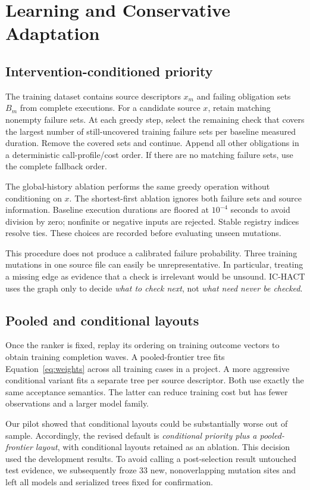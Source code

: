 \documentclass[11pt]{article}
\theoremstyle{definition}\newtheorem{definition}[theorem]{Definition}
\theoremstyle{remark}\newtheorem{remark}[theorem]{Remark}
\begin{document}
\section{Learning and Conservative Adaptation}
\subsection{Intervention-conditioned priority}
The training dataset contains source descriptors $x_m$ and failing obligation sets $B_m$ from complete executions. For a candidate source $x$, retain matching nonempty failure sets. At each greedy step, select the remaining check that covers the largest number of still-uncovered training failure sets per baseline measured duration. Remove the covered sets and continue. Append all other obligations in a deterministic call-profile/cost order. If there are no matching failure sets, use the complete fallback order.

The global-history ablation performs the same greedy operation without conditioning on $x$. The shortest-first ablation ignores both failure sets and source information. Baseline execution durations are floored at $10^{-4}$ seconds to avoid division by zero; nonfinite or negative inputs are rejected. Stable registry indices resolve ties. These choices are recorded before evaluating unseen mutations.

This procedure does not produce a calibrated failure probability. Three training mutations in one source file can easily be unrepresentative. In particular, treating a missing edge as evidence that a check is irrelevant would be unsound. IC-HACT uses the graph only to decide \emph{what to check next}, not \emph{what need never be checked}.

\subsection{Pooled and conditional layouts}
Once the ranker is fixed, replay its ordering on training outcome vectors to obtain training completion waves. A pooled-frontier tree fits Equation~\eqref{eq:weights} across all training cases in a project. A more aggressive conditional variant fits a separate tree per source descriptor. Both use exactly the same acceptance semantics. The latter can reduce training cost but has fewer observations and a larger model family.

Our pilot showed that conditional layouts could be substantially worse out of sample. Accordingly, the revised default is \emph{conditional priority plus a pooled-frontier layout}, with conditional layouts retained as an ablation. This decision used the development results. To avoid calling a post-selection result untouched test evidence, we subsequently froze 33 new, nonoverlapping mutation sites and left all models and serialized trees fixed for confirmation.
\end{document}
